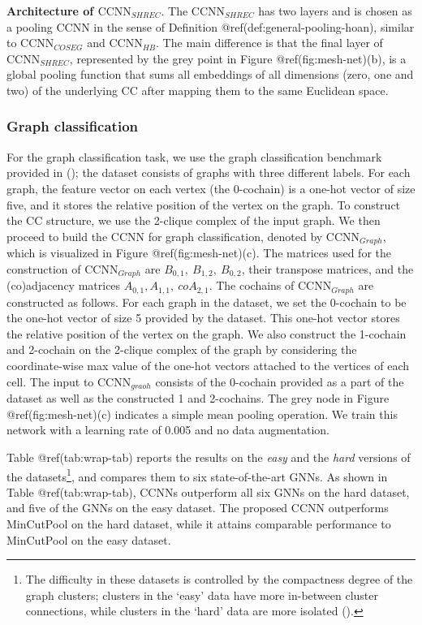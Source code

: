 \documentclass[
  12pt,
]{krantz}
\begin{document}
\textbf{Architecture of \(\mbox{CCNN}_{SHREC}\)}. The
\(\mbox{CCNN}_{SHREC}\) has two layers and is chosen as a pooling CCNN
in the sense of Definition @ref(def:general-pooling-hoan), similar to
\(\mbox{CCNN}_{COSEG}\) and \(\mbox{CCNN}_{HB}\). The main difference is
that the final layer of \(\mbox{CCNN}_{SHREC}\), represented by the grey
point in Figure @ref(fig:mesh-net)(b), is a global pooling function that
sums all embeddings of all dimensions (zero, one and two) of the
underlying CC after mapping them to the same Euclidean space.

\subsubsection{Graph classification}\label{graph-classification}

For the graph classification task, we use the graph classification
benchmark provided in (); the dataset consists of graphs with
three different labels. For each graph, the feature vector on each
vertex (the 0-cochain) is a one-hot vector of size five, and it stores
the relative position of the vertex on the graph. To construct the CC
structure, we use the 2-clique complex of the input graph. We then
proceed to build the CCNN for graph classification, denoted by
\(\mbox{CCNN}_{Graph}\), which is visualized in Figure
@ref(fig:mesh-net)(c). The matrices used for the construction of
\(\mbox{CCNN}_{Graph}\) are \(B_{0,1},~B_{1,2},~B_{0,2}\), their
transpose matrices, and the (co)adjacency matrices
\(A_{0,1},A_{1,1},~coA_{2,1}\). The cochains of \(\mbox{CCNN}_{Graph}\)
are constructed as follows. For each graph in the dataset, we set the
0-cochain to be the one-hot vector of size 5 provided by the dataset.
This one-hot vector stores the relative position of the vertex on the
graph. We also construct the 1-cochain and 2-cochain on the 2-clique
complex of the graph by considering the coordinate-wise max value of the
one-hot vectors attached to the vertices of each cell. The input to
\(\mbox{CCNN}_{graoh}\) consists of the 0-cochain provided as a part of
the dataset as well as the constructed 1 and 2-cochains. The grey node
in Figure @ref(fig:mesh-net)(c) indicates a simple mean pooling
operation. We train this network with a learning rate of 0.005 and no
data augmentation.

Table @ref(tab:wrap-tab) reports the results on the \emph{easy} and the
\emph{hard} versions of the datasets\footnote{The difficulty in these
  datasets is controlled by the compactness degree of the graph
  clusters; clusters in the `easy' data have more in-between cluster
  connections, while clusters in the `hard' data are more isolated
  ().}, and compares them to six state-of-the-art GNNs. As shown in
Table @ref(tab:wrap-tab), CCNNs outperform all six GNNs on the hard
dataset, and five of the GNNs on the easy dataset. The proposed CCNN
outperforms MinCutPool on the hard dataset, while it attains comparable
performance to MinCutPool on the easy dataset.
\end{document}

